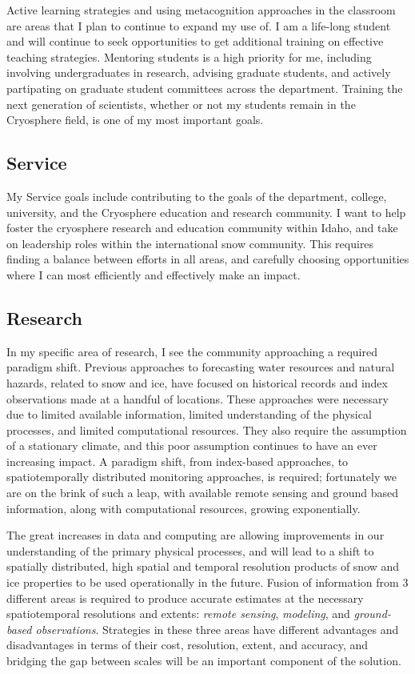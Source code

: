 \documentclass[11pt]{article}
\begin{document}
Active learning strategies and using metacognition approaches in the classroom are areas that I plan to continue to expand my use of.  I am a life-long student and will continue to seek opportunities to get additional training on effective teaching strategies.  Mentoring students is a high priority for me, including involving undergraduates in research, advising graduate students, and actively partipating on graduate student committees across the department.  Training the next generation of scientists, whether or not my students remain in the Cryosphere field, is one of my most important goals.

\subsection{Service}

My Service goals include contributing to the goals of the department, college, university, and the Cryosphere education and research community.  I want to help foster the cryosphere research and education community within Idaho, and take on leadership roles within the international snow community.  This requires finding a balance between efforts in all areas, and carefully choosing opportunities where I can most efficiently and effectively make an impact.

\subsection{Research}

In my specific area of research, I see the community approaching a required paradigm shift.  Previous approaches to forecasting water resources and natural hazards, related to snow and ice, have focused on historical records and index observations made at a handful of locations.  These approaches were necessary due to limited available information, limited understanding of the physical processes, and limited computational resources.  They also require the assumption of a stationary climate, and this poor assumption continues to have an ever increasing impact.  A paradigm shift, from index-based approaches, to spatiotemporally distributed monitoring approaches, is required; fortunately we are on the brink of such a leap, with available remote sensing and ground based information, along with computational resources, growing exponentially.  

The great increases in data and computing are allowing improvements in our understanding of the primary physical processes, and will lead to a shift to spatially distributed, high spatial and temporal resolution products of snow and ice properties to be used operationally in the future.  Fusion of information from 3 different areas is required to produce accurate estimates at the necessary spatiotemporal resolutions and extents: \textit{remote sensing}, \textit{modeling}, and 
\textit{ground-based observations}.  Strategies in these three areas have different advantages and disadvantages in terms of their cost, resolution, extent, and accuracy, and bridging the gap between scales will be an important component of the solution.
\end{document}
